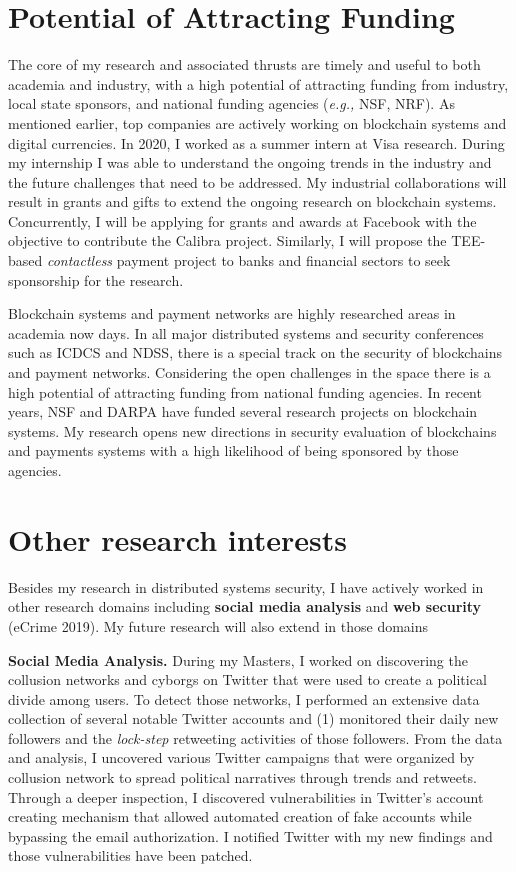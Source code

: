 \documentclass{NSF}
\newcommand{\BfPara}[1]{{\noindent\textbf{#1.}}\xspace}
\newcommand{\eg}{{\em e.g.,}\xspace}
\begin{document}
\section{Potential of Attracting Funding}\vspace{-1mm}
The core of my research and associated thrusts are timely and useful to both academia and industry, with a high potential of attracting funding from industry, local state sponsors, and national funding agencies (\eg NSF, NRF). As mentioned earlier, top companies are actively working on blockchain systems and digital currencies. In 2020, I worked as a summer intern at Visa research. During my internship I was able to understand the ongoing trends in the industry and the future challenges that need to be addressed. My industrial collaborations will result in grants and gifts to extend the ongoing research on blockchain systems. Concurrently, I will be applying for grants and awards at Facebook with the objective to contribute the Calibra project. Similarly, I will propose the TEE-based {\em contactless} payment project to banks and financial sectors to seek sponsorship for the research. 

Blockchain systems and payment networks are highly researched areas in academia now days. In all major distributed systems and security conferences such as ICDCS and NDSS, there is a special track on the security of blockchains and payment networks. Considering the open challenges in the space there is a high potential of attracting funding from national funding agencies. In recent years, NSF and DARPA have funded several research projects on blockchain systems. My research opens new directions in security evaluation of blockchains and payments systems with a high likelihood of being sponsored by those agencies. 



\section{Other research interests} \vspace{-1mm}
Besides my research in distributed systems security, I have actively worked in other research domains including \textbf{social media analysis} and \textbf{web security} (eCrime 2019). My future research will also extend in those domains 


\BfPara{Social Media Analysis} During my Masters, I worked on discovering the collusion networks and cyborgs on Twitter that were used to create a political divide among users. To detect those networks, I performed an extensive data collection of several notable Twitter accounts and (1) monitored their daily new followers and the {\em lock-step} retweeting activities of those followers. From the data and analysis, I uncovered various Twitter campaigns that were organized by collusion network to spread political narratives through trends and retweets. Through a deeper inspection, I discovered vulnerabilities in Twitter's account creating mechanism that allowed automated creation of fake accounts while bypassing the email authorization. I notified Twitter with my new findings and those vulnerabilities have been patched.  
\end{document}

